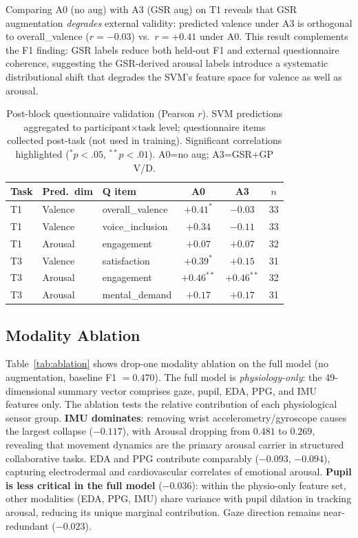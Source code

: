 \documentclass[sigconf,review,anonymous]{acmart}
\begin{document}
Comparing A0 (no aug) with A3 (GSR aug) on T1 reveals that GSR augmentation
\emph{degrades} external validity: predicted valence under A3 is orthogonal
to overall\_valence ($r{=}{-}0.03$) vs.\ $r{=}+0.41$ under A0.
This result complements the F1 finding: GSR labels reduce both held-out F1
and external questionnaire coherence, suggesting the GSR-derived arousal
labels introduce a systematic distributional shift that degrades the SVM's
feature space for valence as well as arousal.

\begin{table}[t]
\caption{Post-block questionnaire validation (Pearson $r$). SVM predictions
  aggregated to participant$\times$task level; questionnaire items collected
  post-task (not used in training). Significant correlations highlighted
  ($^*p{<}.05$, $^{**}p{<}.01$). A0=no aug; A3=GSR+GP V/D.}
\label{tab:q_corr}
\centering
\setlength{\tabcolsep}{3pt}
\small
\begin{tabular}{lllccc}
\toprule
\textbf{Task} & \textbf{Pred.\ dim} & \textbf{Q item} &
  \textbf{A0} & \textbf{A3} & \textbf{$n$} \\
\midrule
T1 & Valence  & overall\_valence   & $+0.41^{*}$  & $-0.03$      & 33 \\
T1 & Valence  & voice\_inclusion   & $+0.34$       & $-0.11$      & 33 \\
T1 & Arousal  & engagement         & $+0.07$       & $+0.07$      & 32 \\
T3 & Valence  & satisfaction       & $+0.39^{*}$  & $+0.15$      & 31 \\
T3 & Arousal  & engagement         & $+0.46^{**}$ & $+0.46^{**}$& 32 \\
T3 & Arousal  & mental\_demand     & $+0.17$       & $+0.17$      & 31 \\
\bottomrule
\end{tabular}
\end{table}

\subsection{Modality Ablation}

Table~\ref{tab:ablation} shows drop-one modality ablation on the
full model (no augmentation, baseline F1 $= 0.470$).
The full model is \emph{physiology-only}: the 49-dimensional summary vector
comprises gaze, pupil, EDA, PPG, and IMU features only.
The ablation tests the relative contribution of each physiological sensor group.
\textbf{IMU dominates}: removing wrist accelerometry/gyroscope causes
the largest collapse ($-0.117$), with Arousal dropping from $0.481$ to
$0.269$, revealing that movement dynamics are the primary arousal carrier
in structured collaborative tasks.
EDA and PPG contribute comparably ($-0.093$, $-0.094$), capturing
electrodermal and cardiovascular correlates of emotional arousal.
\textbf{Pupil is less critical in the full model} ($-0.036$): within the
physio-only feature set, other modalities (EDA, PPG, IMU) share variance with
pupil dilation in tracking arousal, reducing its unique marginal contribution.
Gaze direction remains near-redundant ($-0.023$).
\end{document}
